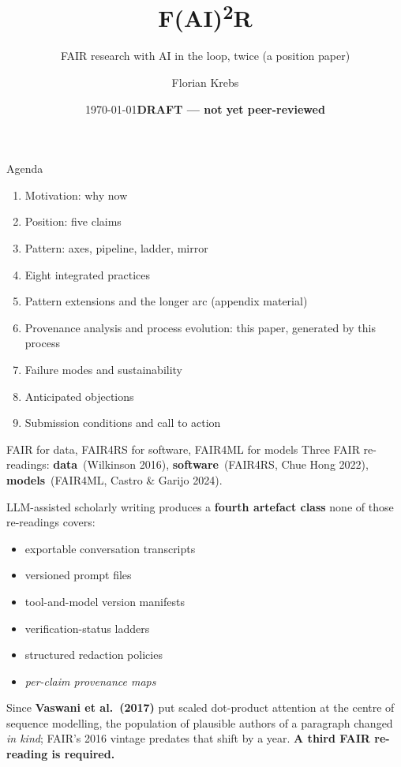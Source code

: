 \documentclass[aspectratio=169,11pt]{beamer}
\title{F(AI)\textsuperscript{2}R}
\subtitle{FAIR research with AI in the loop, twice (a position paper)}
\author{Florian Krebs}
\institute{%
  ORCID: \href{https://orcid.org/0000-0001-6033-801X}{0000-0001-6033-801X}\\
  DLR Zentrum f\"ur Leichtbauproduktionstechnologie (ZLP), Augsburg\\
  Helmholtz \textperiodcentered{} NFDI4Ing \textperiodcentered{} HMC%
}
\date{\today \quad\textcolor{dlrAccent}{\textbf{DRAFT --- not yet peer-reviewed}}}
\begin{document}
\begin{frame}[plain]
  \titlepage
\end{frame}

\begin{frame}{Agenda}
  \begin{enumerate}
    \item Motivation: why now
    \item Position: five claims
    \item Pattern: axes, pipeline, ladder, mirror
    \item Eight integrated practices
    \item Pattern extensions and the longer arc (appendix material)
    \item Provenance analysis and process evolution: this paper, generated by this process
    \item Failure modes and sustainability
    \item Anticipated objections
    \item Submission conditions and call to action
  \end{enumerate}
\end{frame}


\begin{frame}{FAIR for data, FAIR4RS for software, FAIR4ML for models}
  Three FAIR re-readings: \textbf{data}~(Wilkinson 2016), \textbf{software}~(FAIR4RS, Chue Hong 2022), \textbf{models}~(FAIR4ML, Castro \& Garijo 2024).

  \vspace{0.4em}
  LLM-assisted scholarly writing produces a \textbf{fourth artefact class} none of those re-readings covers:
  \begin{itemize}
    \item exportable conversation transcripts
    \item versioned prompt files
    \item tool-and-model version manifests
    \item verification-status ladders
    \item structured redaction policies
    \item \emph{per-claim provenance maps}
  \end{itemize}

  \vspace{0.4em}
  Since \textbf{Vaswani et al.\ (2017)} put scaled dot-product attention at
  the centre of sequence modelling, the population of plausible authors of a
  paragraph changed \emph{in kind}; FAIR's 2016 vintage predates that shift
  by a year. \textbf{A third FAIR re-reading is required.}
\end{frame}
\end{document}
